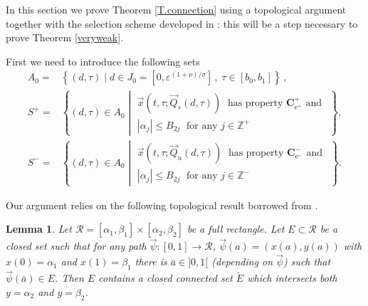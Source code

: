 \documentclass[10pt]{article}
\numberwithin{equation}{section}
\def\ep{\varepsilon}
\def\Z{{\mathbb Z}}
\def\ee{{\mathrm e}}
\def\Q{\vec{Q}}
\def\x{\vec{x}}
\newcommand\bs[1]{{\boldsymbol{#1}}}
\newtheorem{lemma}[theorem]{Lemma}
\theoremstyle{definition}
\theoremstyle{remark}
\begin{document}
In this section we prove Theorem \ref{T.connection} using a topological argument together with  the selection scheme developed in
\cite{CFPrestate}: this   will be a step necessary to prove Theorem \ref{veryweak}.

First we need to introduce the following sets
\begin{equation}\label{defS+}
\begin{split}
A_0= & \left\{ (d,\tau) \mid  d \in  J_0 =
[0, \ep^{(1+\nu)/\underline{\sigma}}  ] \, , \;\tau \in [b_0, b_1] \right\} \,,
\\
S^+=& \left\{ (d,\tau) \in A_0 \middle|  \begin{array}{l}
                                      \x(t,\tau ; \Q_s(d,\tau)) \; \textrm{ has property $\bs{C^+_{\ee^+}}$ and } \\
                                      |\alpha_j| \le  B_{2j}  \; \textrm{ for any $j \in \Z^+$}
                                    \end{array}  \right\},\\
S^-= & \left\{ (d,\tau) \in A_0 \middle|  \begin{array}{l}
                                      \x(t,\tau ; \Q_u(d,\tau)) \; \textrm{ has property $\bs{C^-_{\ee^-}}$ and } \\
                                     |\alpha_j| \le   B_{2j}  \; \textrm{ for any $j \in \Z^-$}
                                    \end{array}  \right\} .
    \end{split}
\end{equation}

Our argument relies on the following topological result borrowed from \cite{PZ}.

 \begin{lemma}\label{top}\cite[Lemma 4]{PZ}
Let  $\mathcal{R}=[\alpha_1,\beta_1] \times [\alpha_2,\beta_2]$  be a   full rectangle. Let
$E \subset \mathcal{R}$ be a closed set such that for any  path $\vec{\psi} : [0,1] \to \mathcal{R}$,
$\vec{\psi}(a)=(x(a),y(a))$ with $x(0)=\alpha_1$ and $x(1)=\beta_1$ there is
$\bar{a} \in ]0,1[$ (depending on $\vec{\psi}$) such that  $\vec{\psi}(\bar{a}) \in E$. Then $E$ contains a
closed connected set $\tilde{E}$  which intersects both $y=\alpha_2$ and $y=\beta_2$.
\end{lemma}
\end{document}
